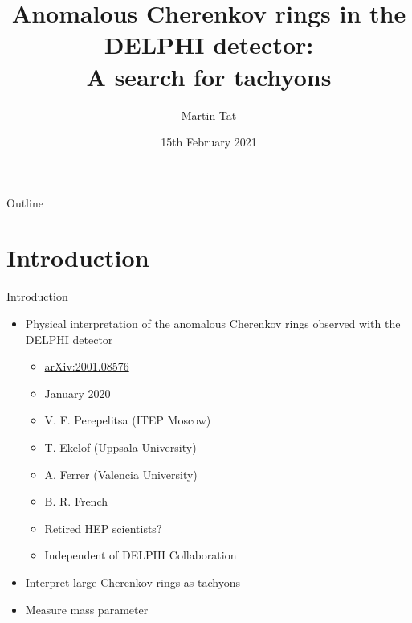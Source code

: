 \documentclass{beamer}
\title[Graduate Symposium]{Anomalous Cherenkov rings in the DELPHI detector:\\A search for tachyons}
\author{Martin Tat}
\institute{University of Oxford}
\date{15th February 2021}
\begin{document}
\begin{frame}
  \titlepage
\end{frame}

\begin{frame}{Outline}
  \tableofcontents
\end{frame}

\section{Introduction}
\begin{frame}{Introduction}
  \begin{itemize}
    \item{Physical interpretation of the anomalous Cherenkov rings observed with the DELPHI detector}
    \begin{itemize}
      \item{\href{https://arxiv.org/abs/2001.08576v1}{arXiv:2001.08576}}
      \item{January 2020}
      \item{V. F. Perepelitsa (ITEP Moscow)}
      \item{T. Ekelof (Uppsala University)}
      \item{A. Ferrer (Valencia University)}
      \item{B. R. French}
      \item{Retired HEP scientists?}
      \item{Independent of DELPHI Collaboration}
    \end{itemize}
    \item{Interpret large Cherenkov rings as tachyons}
    \item{Measure mass parameter}
  \end{itemize}
\end{frame}
\end{document}
